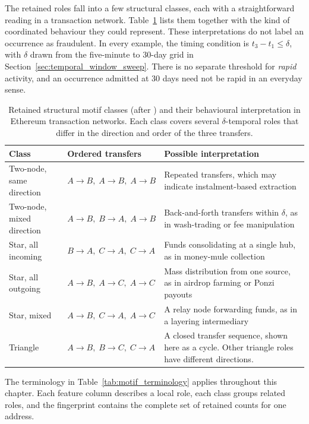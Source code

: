 \documentclass{thesisclass}
\begin{document}
The retained roles fall into a few structural classes, each with a
straightforward reading in a transaction network.
Table~\ref{tab:motif_classes} lists them together with the kind of coordinated
behaviour they could represent. These interpretations do not label an occurrence
as fraudulent. In every example, the timing condition is
$t_3-t_1 \leq \delta$, with $\delta$ drawn from the five-minute to 30-day grid
in Section~\ref{sec:temporal_window_sweep}. There is no separate threshold for
\emph{rapid} activity, and an occurrence admitted at 30 days need not be rapid in
an everyday sense.

\begin{table}[h]
\centering
\caption{Retained structural motif classes (after \citet{paranjape2017motifs})
and their behavioural interpretation in Ethereum transaction networks. Each
class covers several $\delta$-temporal roles that differ in the direction and
order of the three transfers.}
\label{tab:motif_classes}
\begin{tabular}{p{3.5cm} p{4.5cm} p{5cm}}
\toprule
\textbf{Class} & \textbf{Ordered transfers} & \textbf{Possible interpretation} \\
\midrule
Two-node, same direction &
    $A \to B,\; A \to B,\; A \to B$ &
    Repeated transfers, which may indicate instalment-based extraction \\[4pt]
Two-node, mixed direction &
    $A \to B,\; B \to A,\; A \to B$ &
    Back-and-forth transfers within $\delta$, as in wash-trading or fee manipulation \\[4pt]
Star, all incoming &
    $B \to A,\; C \to A,\; C \to A$ &
    Funds consolidating at a single hub, as in money-mule collection \\[4pt]
Star, all outgoing &
    $A \to B,\; A \to C,\; A \to C$ &
    Mass distribution from one source, as in airdrop farming or Ponzi payouts \\[4pt]
Star, mixed &
    $A \to B,\; C \to A,\; A \to C$ &
    A relay node forwarding funds, as in a layering intermediary \\[4pt]
Triangle &
    $A \to B,\; B \to C,\; C \to A$ &
    A closed transfer sequence, shown here as a cycle. Other triangle roles
    have different directions. \\
\bottomrule
\end{tabular}
\end{table}

The terminology in Table~\ref{tab:motif_terminology} applies throughout this
chapter. Each feature column describes a local role, each class groups related
roles, and the fingerprint contains the complete set of retained counts for
one address.
\end{document}
